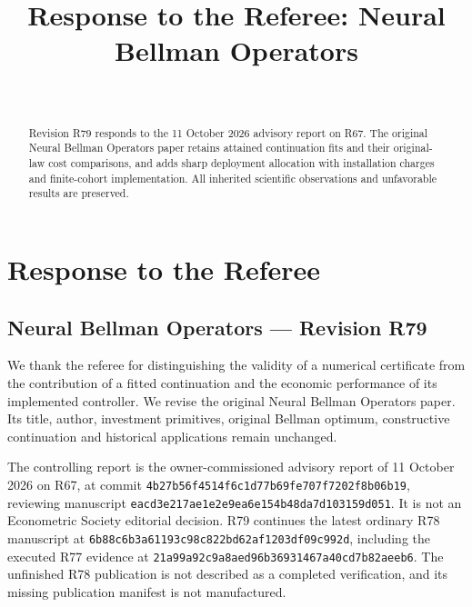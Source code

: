 \documentclass[ecta,nameyear,draft]{econsocart}
\begin{document}
\begin{frontmatter}
\title{Response to the Referee: Neural Bellman Operators}
\begin{aug}
\author[id=au1,addressref={add1}]{~}
\address[id=add1]{Peking University}
\end{aug}
\begin{abstract}Revision R79 responds to the 11 October 2026 advisory report on R67. The original Neural Bellman Operators paper retains attained continuation fits and their original-law cost comparisons, and adds sharp deployment allocation with installation charges and finite-cohort implementation. All inherited scientific observations and unfavorable results are preserved.\end{abstract}
\end{frontmatter}
\providecommand{\tightlist}{\setlength{\itemsep}{0pt}\setlength{\parskip}{0pt}}
\hypertarget{response-to-the-referee}{%
\section{Response to the Referee}\label{response-to-the-referee}}

\hypertarget{neural-bellman-operators-revision-r79}{%
\subsection{Neural Bellman Operators --- Revision
R79}\label{neural-bellman-operators-revision-r79}}

We thank the referee for distinguishing the validity of a numerical
certificate from the contribution of a fitted continuation and the
economic performance of its implemented controller. We revise the
original Neural Bellman Operators paper. Its title, author, investment
primitives, original Bellman optimum, constructive continuation and
historical applications remain unchanged.

The controlling report is the owner-commissioned advisory report of 11
October 2026 on R67, at commit
\nolinkurl{4b27b56f4514f6c1d77b69fe707f7202f8b06b19}, reviewing manuscript
\nolinkurl{eacd3e217ae1e2e9ea6e154b48da7d103159d051}. It is not an
Econometric Society editorial decision. R79 continues the latest
ordinary R78 manuscript at
\nolinkurl{6b88c6b3a61193c98c822bd62af1203df09c992d}, including the
executed R77 evidence at
\nolinkurl{21a99a92c9a8aed96b36931467a40cd7b82aeeb6}. The unfinished R78
publication is not described as a completed verification, and its
missing publication manifest is not manufactured.
\end{document}
